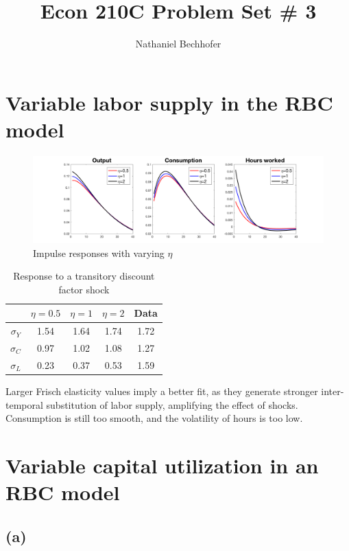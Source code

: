 \documentclass[11pt]{amsart}
\title{Econ 210C Problem Set \# 3}
\author{Nathaniel Bechhofer}
\begin{document}
\maketitle


\section{Variable labor supply in the RBC model}
\begin{figure}[h]
	\centering
	\includegraphics[width=\textwidth]{Minki/Q1}
	\caption{Impulse responses with varying $\eta$}
\end{figure}

\begin{table}[h]
	\centering
	\begin{tabular}{ccccc}
		\hline \hline 
		& $\eta=0.5$  & $\eta = 1$          & $\eta = 2$ & Data  \\
		\hline 
		$\sigma_Y$ &  1.54    & 1.64    & 1.74    & 1.72     \\
		$\sigma_C$ &  0.97    & 1.02   & 1.08       & 1.27 \\
		$\sigma_L$ &   0.23   &  0.37   & 0.53     &  1.59 \\
		\hline
	\end{tabular}
	\caption{Response to a transitory discount factor shock}
\end{table}
Larger Frisch elasticity values imply a better fit, as they generate stronger inter-temporal substitution of labor supply, amplifying the effect of shocks. 
Consumption is still too smooth, and the volatility of hours is too low. 

\newpage

\section{Variable capital utilization in an RBC model}

\subsection*{(a)}
\end{document}
